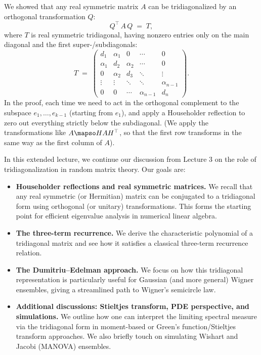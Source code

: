 \documentclass[letterpaper,11pt,oneside,reqno]{article}
\numberwithin{equation}{section}
\theoremstyle{definition}
\begin{document}
We showed that any real symmetric matrix \(A\) can be tridiagonalized by an orthogonal transformation \(Q\):
\[
	Q^\top\,A\,Q \;=\; T,
\]
where \(T\) is real symmetric tridiagonal, having nonzero entries only on the main diagonal and the first super-/subdiagonals:
\begin{equation*}
	T \;=\;
	\begin{pmatrix}
		 d_1 & \alpha_1 & 0 & \cdots & 0\\
		 \alpha_1 & d_2 & \alpha_2 & \cdots & 0\\
		 0 & \alpha_2 & d_3 & \ddots & \vdots\\
		 \vdots & \vdots & \ddots & \ddots & \alpha_{n-1}\\
		 0 & 0 & \cdots & \alpha_{n-1} & d_n
	\end{pmatrix}.
\end{equation*}
In the proof, each time we need to act in the orthogonal complement to the
subspace $e_1,\ldots,e_{k-1}$ (starting from $e_1$),
and apply a Householder reflection to zero out everything strictly
below the subdiagonal. (We apply the transformations like
$A\mapso H A H^{\top}$, so that the first row transforms
in the same way as the first column of $A$).




























In this extended lecture, we continue our discussion from Lecture 3 on the role of tridiagonalization in random matrix theory. Our goals are:

\begin{itemize}
\item {\bf Householder reflections and real symmetric matrices.} We recall that any real symmetric (or Hermitian) matrix can be conjugated to a tridiagonal form using orthogonal (or unitary) transformations. This forms the starting point for efficient eigenvalue analysis in numerical linear algebra.
\item {\bf The three-term recurrence.} We derive the characteristic polynomial of a tridiagonal matrix and see how it satisfies a classical three-term recurrence relation.
\item {\bf The Dumitriu--Edelman approach.} We focus on how this tridiagonal representation is particularly useful for Gaussian (and more general) Wigner ensembles, giving a streamlined path to Wigner’s semicircle law.
\item {\bf Additional discussions: Stieltjes transform, PDE perspective, and simulations.} We outline how one can interpret the limiting spectral measure via the tridiagonal form in moment-based or Green’s function/Stieltjes transform approaches. We also briefly touch on simulating Wishart and Jacobi (MANOVA) ensembles.
\end{itemize}
\end{document}
